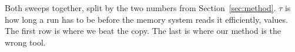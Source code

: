 %
\begin{table}[!t]
\centering
\caption{
Both sweeps together, split by the two numbers from
Section~\ref{sec:method}. $\tau$ is how long a run has to be before the memory
system reads it efficiently, \gateMinDpost{} values. The first row is where we
beat the copy. The last is where our method is the wrong tool.}
\label{tab:tiers}
\small
%
\end{table}
